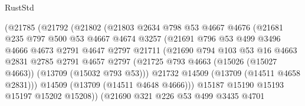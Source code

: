 \begin{lexlean}{RustStd}
\begin{coremodule}
                        (@21785
                          (@21792
                            (@21802
                              (@21803
                                @2634
                                @798
                                @53
                                @4667
                                @4676
                                (@21681
                                  @235
                                  @797
                                  @500
                                  @53
                                  @4667
                                  @4674
                                  @3257
                                  (@21691
                                    @796
                                    @53
                                    @499
                                    @3496
                                    @4666
                                    @4673
                                    @2791
                                    @4647
                                    @2797
                                    @21711
                                    (@21690
                                      @794
                                      @103
                                      @53
                                      @16
                                      @4663
                                      @2831
                                      @2785
                                      @2791
                                      @4657
                                      @2797
                                      (@21725
                                        @793
                                        @4663
                                        (@15026 (@15027 @4663))
                                        (@13709 (@15032 @793 @53)))
                                      @21732
                                      @14509
                                      (@13709 (@14511 @4658 @2831)))
                                    @14509
                                    (@13709 (@14511 @4648 @4666)))
                                  @15187
                                  @15190
                                  @15193
                                  @15197
                                  @15202
                                  @15208))
                              (@21690
                                @321
                                @226
                                @53
                                @499
                                @3435
                                @4701

\end{coremodule}
\end{lexlean}
